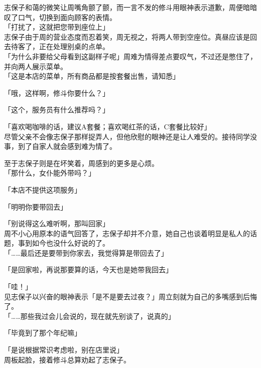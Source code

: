 志保子和蔼的微笑让周嘴角颤了颤，而一言不发的修斗用眼神表示道歉，周便暗暗叹了口气，切换到面向顾客的表情。\\

「打扰了，这就把您带到座位上」\\

志保子由于周的营业态度而忍着笑，周无视之，将两人带到空座位。真昼应该是回去待客了，正在处理别桌的点单。\\

「为什么非要给父母看到这副样子呢」周难为情得差点要叹气，不过还是憋住了，并向两人展示菜单。\\

「这是本店的菜单，所有商品都是按套餐出售，请知悉」

「哦，这样啊，修斗你要什么？」

「这个，服务员有什么推荐吗？」

「喜欢喝咖啡的话，建议A套餐；喜欢喝红茶的话，C套餐比较好」\\

尽管父亲不会像志保子那样捉弄人，但他欣慰的眼神还是让人难受的。接待同学没事，到了自家人就会感到难为情了。

至于志保子则是在坏笑着，周感到的更多是心烦。\\

「那什么，女仆能外带吗？」

「本店不提供这项服务」

「明明你要带回去」

「别说得这么难听啊，那叫回家」\\

周不小心用原本的语气回答了，志保子却并不介意，她自己也谈着明显是私人的话题，事到如今也没什么好说的了。\\

「……最后还是要带到你家去，我觉得算是带回去了」

「是回家啦，再说那要算的话，今天也是她带我回去」

「哇！」\\

见志保子以兴奋的眼神表示「是不是要去过夜？」周立刻就为自己的多嘴感到后悔了。\\

「……那些我过会儿会说的，现在就先别谈了，说真的」

「毕竟到了那个年纪嘛」

「是说根据常识考虑啦，别在店里说」\\

周板起脸，接着修斗总算劝起了志保子。\\

